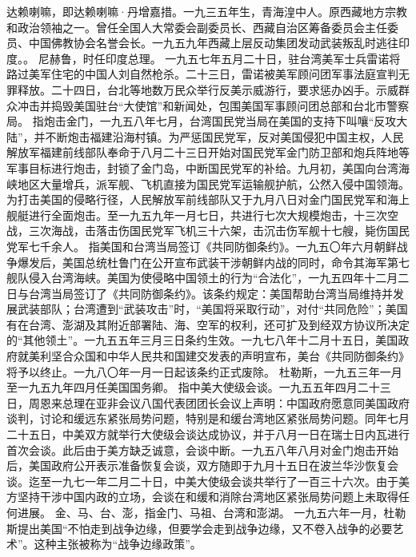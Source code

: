 \begin{maonote}
达赖喇嘛，即达赖喇嘛·丹增嘉措。一九三五年生，青海湟中人。原西藏地方宗教和政治领袖之一。曾任全国人大常委会副委员长、西藏自治区筹备委员会主任委员、中国佛教协会名誉会长。一九五九年西藏上层反动集团发动武装叛乱时逃往印度。。
尼赫鲁，时任印度总理。
一九五七年五月二十日，驻台湾美军士兵雷诺将路过美军住宅的中国人刘自然枪杀。二十三日，雷诺被美军顾问团军事法庭宣判无罪释放。二十四日，台北等地数万民众举行反美示威游行，要求惩办凶手。示威群众冲击并捣毁美国驻台“大使馆”和新闻处，包围美国军事顾问团总部和台北市警察局。
指炮击金门，一九五八年七月，台湾国民党当局在美国的支持下叫嚷“反攻大陆”，并不断炮击福建沿海村镇。为严惩国民党军，反对美国侵犯中国主权，人民解放军福建前线部队奉命于八月二十三日开始对国民党军金门防卫部和炮兵阵地等军事目标进行炮击，封锁了金门岛，中断国民党军的补给。九月初，美国向台湾海峡地区大量增兵，派军舰、飞机直接为国民党军运输舰护航，公然入侵中国领海。为打击美国的侵略行径，人民解放军前线部队又于九月八日对金门国民党军和海上舰艇进行全面炮击。至一九五九年一月七日，共进行七次大规模炮击，十三次空战，三次海战，击落击伤国民党军飞机三十六架，击沉击伤军舰十七艘，毙伤国民党军七千余人。
指美国和台湾当局签订《共同防御条约》。一九五〇年六月朝鲜战争爆发后，美国总统杜鲁门在公开宣布武装干涉朝鲜内战的同时，命令其海军第七舰队侵入台湾海峡。美国为使侵略中国领土的行为“合法化”，一九五四年十二月二日与台湾当局签订了《共同防御条约》。该条约规定：美国帮助台湾当局维持并发展武装部队；台湾遭到“武装攻击”时，“美国将采取行动”，对付“共同危险”；美国有在台湾、澎湖及其附近部署陆、海、空军的权利，还可扩及到经双方协议所决定的“其他领土”。一九五五年三月三日条约生效。一九七八年十二月十五日，美国政府就美利坚合众国和中华人民共和国建交发表的声明宣布，美台《共同防御条约》将予以终止。一九八〇年一月一日起该条约正式废除。
杜勒斯，一九五三年一月至一九五九年四月任美国国务卿。
指中美大使级会谈。一九五五年四月二十三日，周恩来总理在亚非会议八国代表团团长会议上声明：中国政府愿意同美国政府谈判，讨论和缓远东紧张局势问题，特别是和缓台湾地区紧张局势问题。同年七月二十五日，中美双方就举行大使级会谈达成协议，并于八月一日在瑞士日内瓦进行首次会谈。此后由于美方缺乏诚意，会谈中断。一九五八年八月对金门炮击开始后，美国政府公开表示准备恢复会谈，双方随即于九月十五日在波兰华沙恢复会谈。迄至一九七一年二月二十日，中美大使级会谈共举行了一百三十六次。由于美方坚持干涉中国内政的立场，会谈在和缓和消除台湾地区紧张局势问题上未取得任何进展。
金、马、台、澎，指金门、马祖、台湾和澎湖。
一九五六年一月，杜勒斯提出美国“不怕走到战争边缘，但要学会走到战争边缘，又不卷入战争的必要艺术”。这种主张被称为“战争边缘政策”。
\end{maonote}
